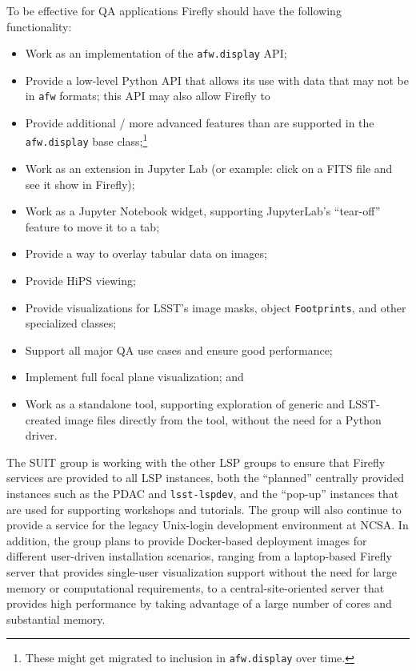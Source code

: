 \documentclass[DM,authoryear,toc,lsstdraft]{lsstdoc}
\begin{document}
To be effective for QA applications Firefly should have the following functionality:
\begin{itemize}
  \item{Work as an implementation of the \verb|afw.display| API;}
  \item{Provide a low-level Python API that allows its use with data that may not be in \verb|afw| formats; this API may also allow Firefly to}
  \item{Provide additional / more advanced features than are supported in the \verb|afw.display| base class;\footnote{These might get migrated to inclusion in \verb|afw.display| over time.}}
  \item{Work as an extension in Jupyter Lab (or example: click on a FITS file and see it show in Firefly);}
  \item{Work as a Jupyter Notebook widget, supporting JupyterLab's ``tear-off'' feature to move it to a tab;}
  \item{Provide a way to overlay tabular data on images;}
  \item{Provide HiPS viewing;}
  \item{Provide visualizations for LSST's image masks, object \verb|Footprints|, and other specialized classes;}
  \item{Support all major QA use cases and ensure good performance;}
  \item{Implement full focal plane visualization; and}
  \item{Work as a standalone tool, supporting exploration of generic and LSST-created image files directly from the tool, without the need for a Python driver.}
\end{itemize}

The SUIT group is working with the other LSP groups to ensure that Firefly services are provided to all LSP instances,
both the ``planned'' centrally provided instances such as the PDAC and \verb|lsst-lspdev|, and the ``pop-up'' instances
that are used for supporting workshops and tutorials.
The group will also continue to provide a service for the legacy Unix-login development environment at NCSA.
In addition, the group plans to provide Docker-based deployment images for different user-driven installation scenarios,
ranging from a laptop-based Firefly server that provides single-user visualization support without the need for large memory or computational requirements,
to a central-site-oriented server that provides high performance by taking advantage of a large number of cores and substantial memory.
\end{document}
